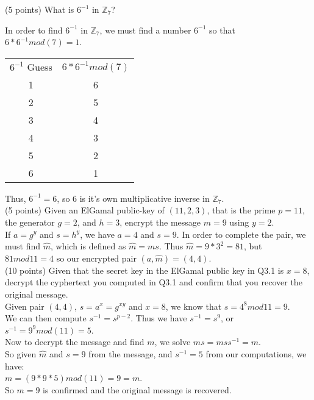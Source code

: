 \documentclass{article}
\begin{document}
(5 points) What is $6^{-1}$ in $\mathbb{Z}_{7}$?
\vspace*{1em}

In order to find $6^{-1}$ in $\mathbb{Z}_7$, we must find a number $6^{-1}$ so that $6*6^{-1} mod(7) = 1$. 
\begin{center}
    \begin{tabular}{|| c c ||}
    \hline
    $6^{-1}$ Guess & $6*6^{-1} mod(7)$ \\[0.5ex]
         1 & 6  \\
         2 & 5 \\
         3 & 4 \\
         4 & 3 \\
         5 & 2 \\
         6 & 1\\
         \hline
    \end{tabular}
\end{center}
Thus, $6^{-1} = 6$, so 6 is it's own multiplicative inverse in $\mathbb{Z}_7$.
\\

(5 points) Given an ElGamal public-key of $(11,2,3)$, that is the prime $p = 11$, the generator $g = 2$, and $h = 3$, encrypt the message $m = 9$ using $y = 2$. 
\vspace*{1em}
\\
If $a = g^y$ and $ s = h^y$, we have $a = 4$ and $s = 9$. In order to complete the pair, we must find $\hat{m}$, which is defined as $\hat{m} = ms$. Thus $\hat{m} = 9*3^2 = 81$, but $81 mod 11 = 4$ so our encrypted pair $(a, \hat{m}) = (4, 4)$.
\\

(10 points) Given that the secret key in the ElGamal public key in Q3.1 is $x=8$, decrypt the cyphertext you computed in Q3.1 and confirm that you recover the original message. 
\vspace*{1em}
\\
Given pair $(4,4)$, $s = a^x = g^{xy}$ and $x = 8$, we know that $s = 4^8 mod 11 = 9$.
\\
We can then compute $s^{-1} = s^{p-2}$. Thus we have $s^{-1} = s^{9}$, or $s^{-1} = 9^9 mod(11) = 5$. 
\\
Now to decrypt the message and find $m$, we solve $\hat{m}s = mss^{-1} = m$. 
\\
So given $\hat{m}$ and $s = 9$ from the message, and $s^{-1} = 5$ from our computations, we have:
\\
$m = (9*9*5)mod(11) = 9 = m$. 
\\
So $m=9$ is confirmed and the original message is recovered.
\\
\end{document}
